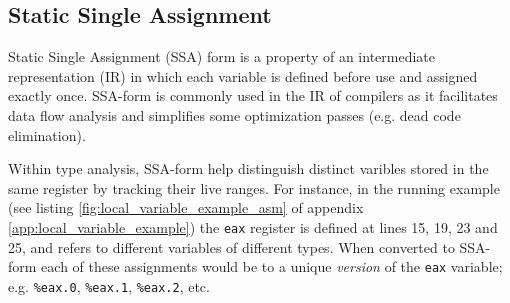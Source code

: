 
\subsection{Static Single Assignment}

Static Single Assignment (SSA) form is a property of an intermediate representation (IR) in which each variable is defined before use and assigned exactly once. SSA-form is commonly used in the IR of compilers as it facilitates data flow analysis and simplifies some optimization passes (e.g. dead code elimination).


Within type analysis, SSA-form help distinguish distinct varibles stored in the same register by tracking their live ranges. For instance, in the running example (see listing \ref{fig:local_variable_example_asm} of appendix \ref{app:local_variable_example}) the \texttt{eax} register is defined at lines 15, 19, 23 and 25, and refers to different variables of different types. When converted to SSA-form each of these assignments would be to a unique \textit{version} of the \texttt{eax} variable; e.g. \texttt{\%eax.0}, \texttt{\%eax.1}, \texttt{\%eax.2}, etc.



